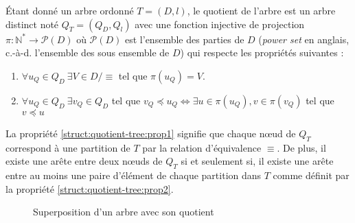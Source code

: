 \begin{definition}
    Étant donné un arbre ordonné $T = (D, l)$, le quotient de l'arbre est un arbre distinct noté $Q_T = (Q_D, Q_l)$ avec une fonction injective de projection $\pi : \mathbb{N}^* \to \mathcal{P}(D)$ où $\mathcal{P}(D)$ est l'ensemble des parties de $D$ (\emph{power set} en anglais, c.-à-d. l'ensemble des sous ensemble de $D$) qui respecte les propriétés suivantes :
    \begin{enumerate}
        \item \label{struct:quotient-tree:prop1} $\forall u_Q \in Q_D ~ \exists V \in D / \equiv$ tel que $\pi(u_Q) = V$.
        \item \label{struct:quotient-tree:prop2} $\forall u_Q \in Q_D ~ \exists v_Q \in Q_D$ tel que $v_Q \preceq u_Q \iff \exists u \in \pi(u_Q), v \in \pi(v_Q)$ tel que $v \preceq u$
    \end{enumerate}
    La propriété \ref{struct:quotient-tree:prop1} signifie que chaque nœud de $Q_T$ correspond à une partition de $T$ par la relation d'équivalence $\equiv$.
    De plus, il existe une arête entre deux nœuds de $Q_T$ si et seulement si, il existe une arête entre au moins une paire d'élément de chaque partition dans $T$ comme définit par la propriété \ref{struct:quotient-tree:prop2}.
\end{definition}

\begin{example}
    \begin{figure}
        \centering
        \caption{Superposition d'un arbre avec son quotient}
    \end{figure}
\end{example}

